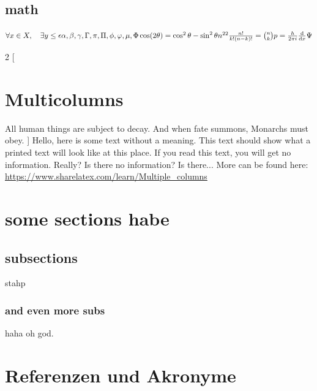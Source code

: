 \documentclass[10pt,a4paper]{article}
\begin{document}
\subsection{math}
\(
\forall x \in X, \quad \exists y \leq \epsilon 
\\
\alpha, \beta, \gamma, \Gamma, \pi, \Pi, \phi, \varphi, \mu, \Phi
\\
\cos (2\theta) = \cos^2 \theta - \sin^2 \theta
\\
n^{22}
\\
\frac{n!}{k!(n-k)!} = \binom{n}{k}
\\
p = \frac{h}{2\pi i}\frac{\mathrm d}{\mathrm d x}\Psi
\)

\begin{multicols}{2}
[
\section{Multicolumns} All human things are subject to decay. And when fate summons, Monarchs must obey.
]
Hello, here is some text without a meaning.  This text should show what 
a printed text will look like at this place.
If you read this text, you will get no information.  Really?  Is there 
no information?  Is there...
More can be found here: \url{https://www.sharelatex.com/learn/Multiple_columns}
\end{multicols}

\section{some sections habe}
\subsection{subsections}
stahp
\subsubsection{and even more subs}
haha oh god.

\section{Referenzen und Akronyme}

\printglossaries


%
%

%


\listoffigures
\listoftables

\end{document}
